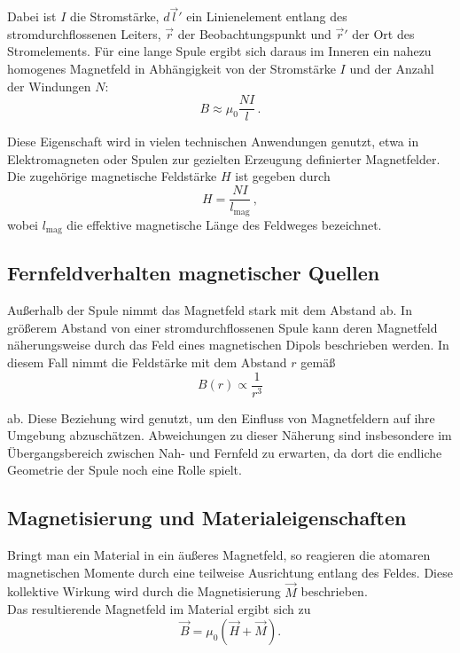 \noindent Dabei ist $I$ die Stromstärke, $d\vec{l}'$ ein Linienelement entlang des stromdurchflossenen Leiters, $\vec{r}$ der Beobachtungspunkt und $\vec{r}'$ der Ort des Stromelements. Für eine lange Spule ergibt sich daraus im Inneren ein nahezu homogenes Magnetfeld in Abhängigkeit von der Stromstärke $I$ und der Anzahl der Windungen $N$:
\begin{equation}
B \approx \mu_\text{0} \frac{N I}{l}\,.
\end{equation}

\noindent Diese Eigenschaft wird in vielen technischen Anwendungen genutzt, etwa in Elektromagneten oder Spulen zur gezielten Erzeugung definierter Magnetfelder. Die zugehörige magnetische Feldstärke $H$ ist gegeben durch
\begin{equation}
H = \frac{N I}{l_{\text{mag}}}\, ,
\end{equation}
\noindent wobei $l_{\text{mag}}$ die effektive magnetische Länge des Feldweges bezeichnet.~\cite[S. 895 ff.]{Tipler}

\subsection{Fernfeldverhalten magnetischer Quellen}
Außerhalb der Spule nimmt das Magnetfeld stark mit dem Abstand ab. 
In größerem Abstand von einer stromdurchflossenen Spule kann deren Magnetfeld näherungsweise durch das Feld eines magnetischen Dipols beschrieben werden. In diesem Fall nimmt die Feldstärke mit dem Abstand $r$ gemäß
\begin{equation}
B(r) \propto \frac{1}{r^3}
\end{equation}

\noindent ab.
Diese Beziehung wird genutzt, um den Einfluss von Magnetfeldern auf ihre Umgebung abzuschätzen. Abweichungen zu dieser Näherung sind insbesondere im Übergangsbereich zwischen Nah- und Fernfeld zu erwarten, da dort die endliche Geometrie der Spule noch eine Rolle spielt. \cite{Skript}

\subsection{Magnetisierung und Materialeigenschaften}

Bringt man ein Material in ein äußeres Magnetfeld, so reagieren die atomaren magnetischen Momente durch eine teilweise Ausrichtung entlang des Feldes. Diese kollektive Wirkung wird durch die Magnetisierung $\vec{M}$ beschrieben. \\
Das resultierende Magnetfeld im Material ergibt sich zu
\begin{equation}
\vec{B} = \mu_\text{0} (\vec{H} + \vec{M}).
\end{equation}

